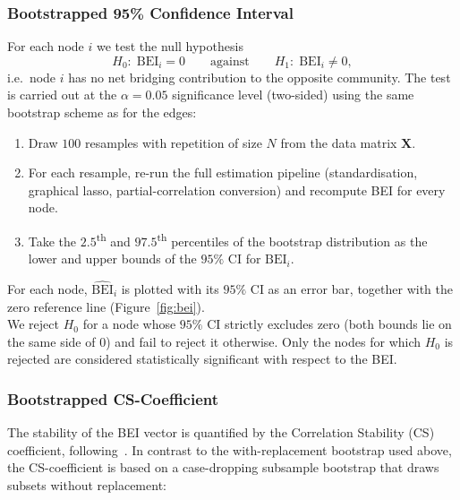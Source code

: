 \documentclass{article}
\begin{document}
\subsubsection{Bootstrapped 95\% Confidence Interval}
\label{sec:bei-ci}
For each node $i$ we test the null hypothesis
\[
    H_0:\; \mathrm{BEI}_i = 0 \qquad \text{against} \qquad
    H_1:\; \mathrm{BEI}_i \neq 0,
\]
i.e.\ node $i$ has no net bridging contribution to the opposite
community. The test is carried out at the $\alpha = 0.05$ significance
level (two-sided) using the same bootstrap scheme as for the edges:
\begin{enumerate}
    \item Draw $100$ resamples with repetition of size $N$ from the data
        matrix $\mathbf{X}$.

    \item For each resample, re-run the full estimation pipeline
        (standardisation, graphical lasso, partial-correlation
        conversion) and recompute BEI for every node.

    \item Take the $2.5$\textsuperscript{th} and
        $97.5$\textsuperscript{th} percentiles of the bootstrap
        distribution as the lower and upper bounds of the $95\%$ CI for
        $\mathrm{BEI}_i$.
\end{enumerate}
For each node, $\widehat{\mathrm{BEI}}_i$ is plotted with its $95\%$ CI as an error bar, together with the zero reference line (Figure~\ref{fig:bei}). \\

We reject $H_0$ for a node whose $95\%$ CI strictly excludes zero (both bounds lie on the same side of $0$) and fail to reject it otherwise. Only the nodes for which $H_0$ is rejected are considered statistically significant with respect to the BEI.

\subsubsection{Bootstrapped CS-Coefficient}
The stability of the BEI vector is quantified by the Correlation Stability (CS) coefficient, following~\textcite{epskamp2018tutorial}. In
contrast to the with-replacement bootstrap used above, the
CS-coefficient is based on a case-dropping subsample bootstrap that draws subsets without replacement:
\end{document}
